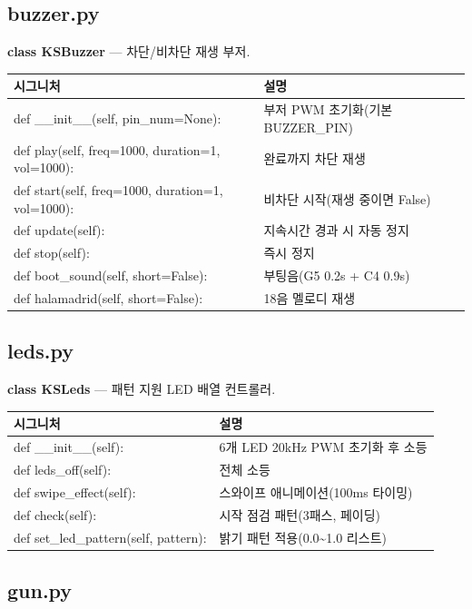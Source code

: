 \subsection{buzzer.py}

\noindent\textbf{class KSBuzzer} --- 차단/비차단 재생 부저.

\begin{longtable}{S{7.6cm} L{6.4cm}}
\toprule
{}\normalfont\sffamily\bfseries 시그니처 & \normalfont\sffamily\bfseries 설명 \\
\midrule
\endhead
def \_\_init\_\_(self, pin\_num=None): & 부저 PWM 초기화(기본 BUZZER\_PIN) \\
def play(self, freq=1000, duration=1, vol=1000): & 완료까지 차단 재생 \\
def start(self, freq=1000, duration=1, vol=1000): & 비차단 시작(재생 중이면 False) \\
def update(self): & 지속시간 경과 시 자동 정지 \\
def stop(self): & 즉시 정지 \\
def boot\_sound(self, short=False): & 부팅음(G5 0.2s + C4 0.9s) \\
def halamadrid(self, short=False): & 18음 멜로디 재생 \\
\bottomrule
\end{longtable}

\subsection{leds.py}

\noindent\textbf{class KSLeds} --- 패턴 지원 LED 배열 컨트롤러.

\begin{longtable}{S{7.4cm} L{6.6cm}}
\toprule
{}\normalfont\sffamily\bfseries 시그니처 & \normalfont\sffamily\bfseries 설명 \\
\midrule
\endhead
def \_\_init\_\_(self): & 6개 LED 20kHz PWM 초기화 후 소등 \\
def leds\_off(self): & 전체 소등 \\
def swipe\_effect(self): & 스와이프 애니메이션(100ms 타이밍) \\
def check(self): & 시작 점검 패턴(3패스, 페이딩) \\
def set\_led\_pattern(self, pattern): & 밝기 패턴 적용(0.0\textasciitilde 1.0 리스트) \\
\bottomrule
\end{longtable}

\subsection{gun.py}

